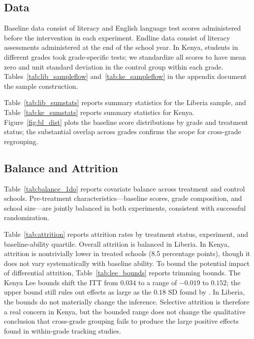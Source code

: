 \documentclass[11pt]{article}
\begin{document}
\subsection{Data}

Baseline data consist of literacy and English language test scores administered before the intervention in each experiment. Endline data consist of literacy assessments administered at the end of the school year. In Kenya, students in different grades took grade-specific tests; we standardize all scores to have mean zero and unit standard deviation in the control group within each grade. Tables~\ref{tab:lib_sampleflow} and~\ref{tab:ke_sampleflow} in the appendix document the sample construction.

Table~\ref{tab:lib_sumstats} reports summary statistics for the Liberia sample, and Table~\ref{tab:ke_sumstats} reports summary statistics for Kenya. Figure~\ref{fig:bl_dist} plots the baseline score distributions by grade and treatment status; the substantial overlap across grades confirms the scope for cross-grade regrouping.

\subsection{Balance and Attrition}

Table~\ref{tab:balance_1do} reports covariate balance across treatment and control schools. Pre-treatment characteristics---baseline scores, grade composition, and school size---are jointly balanced in both experiments, consistent with successful randomization.

Table~\ref{tab:attrition} reports attrition rates by treatment status, experiment, and baseline-ability quartile. Overall attrition is balanced in Liberia. In Kenya, attrition is nontrivially lower in treated schools (8.5 percentage points), though it does not vary systematically with baseline ability. To bound the potential impact of differential attrition, Table~\ref{tab:lee_bounds} reports \citet{lee2009training} trimming bounds. The Kenya Lee bounds shift the ITT from $0.034$ to a range of $-0.019$ to $0.152$; the upper bound still rules out effects as large as the $0.18$ SD found by \citet{duflo2011peer}. In Liberia, the bounds do not materially change the inference. Selective attrition is therefore a real concern in Kenya, but the bounded range does not change the qualitative conclusion that cross-grade grouping fails to produce the large positive effects found in within-grade tracking studies.
\end{document}
